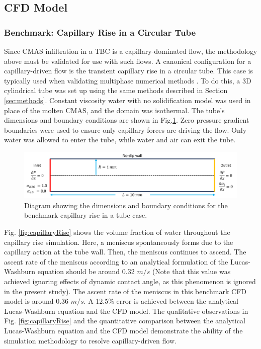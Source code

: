\documentclass{UCF_ETD}
\begin{document}
\subsection{CFD Model}
\subsubsection{Benchmark: Capillary Rise in a Circular Tube}

Since CMAS infiltration in a TBC is a capillary-dominated flow, the methodology above must be validated for use with such flows.
A canonical configuration for a capillary-driven flow is the transient capillary rise in a circular tube.
This case is typically used when validating multiphase numerical methods \cite{GRUNDING2020142, Shiri2022}. 
To do this, a 3D cylindrical tube was set up using the same methods described in Section \ref{sec:methods}.
Constant viscosity water with no solidification model was used in place of the molten CMAS, and the domain was isothermal.
The tube's dimensions and boundary conditions are shown in Fig.\ref{fig:benchmark_diagram}. Zero pressure gradient boundaries were used to ensure only capillary forces are driving the flow. Only water was allowed to enter the tube, while water and air can exit the tube.

\begin{figure}
    \centering
    \includegraphics[width=\linewidth]{Figures/capillaryRiseDiagram.png}
    \caption{Diagram showing the dimensions and boundary conditions for the benchmark capillary rise in a tube case.}
    \label{fig:benchmark_diagram}
\end{figure}

Fig. \ref{fig:capillaryRise} shows the volume fraction of water throughout the capillary rise simulation. Here, a meniscus spontaneously forms due to the capillary action at the tube wall. Then, the meniscus continues to ascend. The ascent rate of the meniscus according to an analytical formulation of the Lucas-Washburn equation \cite{HAMRAOUI2002415} should be around 0.32 $m/s$  (Note that this value was achieved ignoring effects of dynamic contact angle, as this phenomenon is ignored in the present study). The ascent rate of the meniscus in this benchmark CFD model is around 0.36 $m/s$. A 12.5\% error is achieved between the analytical Lucas-Washburn equation and the CFD model. The qualitative observations in Fig. \ref{fig:capillaryRise} and the quantitative comparison between the analytical Lucas-Washburn equation and the CFD model demonstrate the ability of the simulation methodology to resolve capillary-driven flow. 
\end{document}
